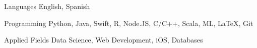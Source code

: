 

\begin{cvskills}

\cvskill
  {Languages} %
  {English, Spanish} %

  \cvskill
    {Programming} %
    {Python, Java, Swift, R, Node.JS, C/C++, Scala, ML, LaTeX, Git} %

  \cvskill
    {Applied Fields} %
    {Data Science, Web Development, iOS, Databases} %

\end{cvskills}
